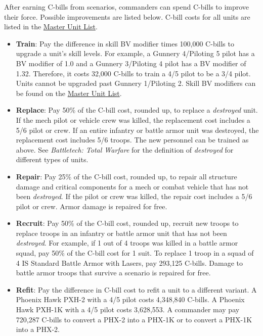 \documentclass[UTF8]{article}
\begin{document}
After earning C-bills from scenarios, commanders can spend C-bills to improve their force.
Possible improvements are listed below.
C-bill costs for all units are listed in the \href{http://www.masterunitlist.info/}{Master Unit List}.\\

\begin{itemize}

\item {\bf Train}: Pay the difference in skill BV modifier times 100,000 C-bills to upgrade a unit's skill levels.
For example, a Gunnery 4/Piloting 5 pilot has a BV modifier of 1.0 and a Gunnery 3/Piloting 4 pilot has a BV modifier of 1.32.
Therefore, it costs 32,000 C-bills to train a 4/5 pilot to be a 3/4 pilot.
Units cannot be upgraded past Gunnery 1/Piloting 2.
Skill BV modifiers can be found on the \href{http://www.masterunitlist.info/}{Master Unit List}.

\item {\bf Replace}: Pay 50\% of the C-bill cost, rounded up, to replace a \emph{destroyed} unit.
If the mech pilot or vehicle crew was killed, the replacement cost includes a 5/6 pilot or crew.
If an entire infantry or battle armor unit was destroyed, the replacement cost includes 5/6 troops.
The new personnel can be trained as above.
See \emph{Battletech: Total Warfare} for the definition of \emph{destroyed} for different types of units.

\item {\bf Repair}: Pay 25\% of the C-bill cost, rounded up, to repair all structure damage and critical components for a mech or combat vehicle that has not been \emph{destroyed}.
If the pilot or crew was killed, the repair cost includes a 5/6 pilot or crew.
Armor damage is repaired for free.

\item {\bf Recruit}: Pay 50\% of the C-bill cost, rounded up, recruit new troops to replace troops in an infantry or battle armor unit that has not been \emph{destroyed}.
For example, if 1 out of 4 troops was killed in a battle armor squad, pay 50\% of the C-bill cost for 1 suit.
To replace 1 troop in a squad of 4 IS Standard Battle Armor with Lasers, pay 293,125 C-bills.
Damage to battle armor troops that survive a scenario is repaired for free.

\item {\bf Refit}: Pay the difference in C-bill cost to refit a unit to a different variant.
A Phoenix Hawk PXH-2 with a 4/5 pilot costs 4,348,840 C-bills.
A Phoenix Hawk PXH-1K with a 4/5 pilot costs 3,628,553.
A commander may pay 720,287 C-bills to convert a PHX-2 into a PHX-1K or to convert a PHX-1K into a PHX-2.


\end{itemize}
\end{document}

